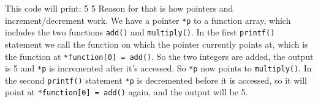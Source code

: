 \documentclass{article}
\begin{document}
  This code will print: 5 5 \newline
  Reason for that is how pointers and increment/decrement work. We have a pointer \verb|*p| to a function array, 
  which includes the two functions \verb|add()| and \verb|multiply()|. In the first \verb|printf()| statement we 
  call the function on which the pointer currently points at, which is the function at \verb|*function[0] = add()|. 
  So the two integers are added, the output is 5 and \verb|*p| is incremented after it's accessed. 
  So \verb|*p| now points to \verb|multiply()|. In the second \verb|printf()| statement
  \verb|*p| is decremented before it is accessed, so it will point at \verb|*function[0] = add()| again, and the output will be 5.
\end{document}

